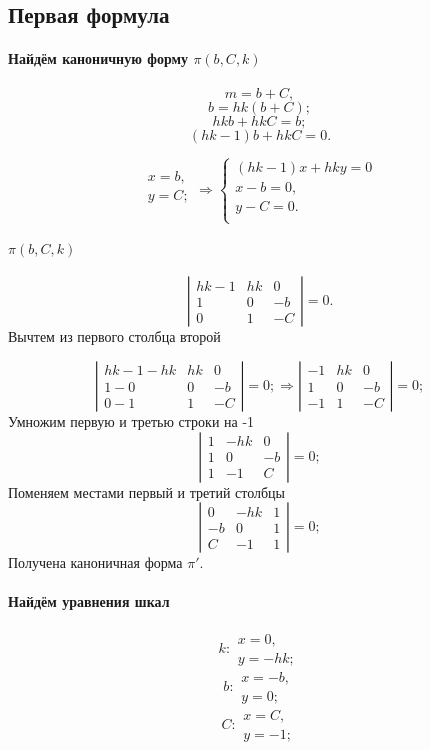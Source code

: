 \subsection{Первая формула}
\paragraph{Найдём каноничную форму $\pi(b, C, k)$}
$$m = b + C,$$
$$b = h k \left( b+ C \right);$$
$$h k b + h k C = b;$$
$$\left(h k -1\right) b + h k C = 0.$$

$$
\begin{array}{l}
x = b,\\
y = C;\\
\end{array}
\Rightarrow
\left\{
	\begin{array}{l}
		\left(h k -1\right) x + h k y = 0 \\
		x - b = 0,\\
		y - C = 0.\\
	\end{array}
\right.
$$

\paragraph{$\pi(b, C, k)$}
$$
\left|
\begin{array}{lll}
	h k -1 & hk & 0 \\
	1 & 0 & -b \\
	0 & 1 & -C
\end{array}
\right|
=0.
$$
Вычтем из первого столбца второй

$$
\left|
\begin{array}{lll}
	h k -1 - hk & hk & 0 \\
	1     - 0  & 0  & -b \\
	0     - 1  & 1  & -C
\end{array}
\right|
=0;
\Rightarrow
\left|
\begin{array}{lll}
	-1 & hk & 0 \\
	1  & 0  & -b \\
	-1 & 1  & -C
\end{array}
\right|
=0;
$$
Умножим первую и третью строки на -1
$$
\left|
\begin{array}{lll}
	1 & -hk & 0 \\
	1 & 0   & -b \\
	1 & -1  & C
\end{array}
\right|
=0;
$$
Поменяем местами первый и третий столбцы
$$
\left|
\begin{array}{lll}
	0  & -hk & 1 \\
	-b  & 0   & 1 \\
	C & -1  & 1 
\end{array}
\right|
=0;
$$
Получена каноничная форма $\pi'$.
\paragraph{Найдём уравнения шкал}
$$k:
\begin{array}{l}
	x = 0,\\
	y = -hk;
\end{array}
$$
$$b:
\begin{array}{l}
	x = -b,\\
	y = 0;
\end{array}
$$
$$C:
\begin{array}{l}
	x = C,\\
	y = -1;
\end{array}
$$
